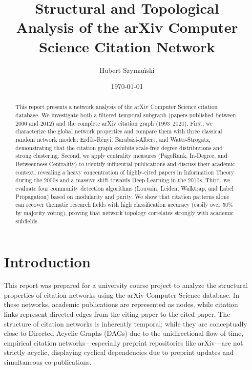 \documentclass[11pt,a4paper]{article}
\begin{document}
\title{\textbf{\Large Structural and Topological Analysis of the arXiv Computer Science Citation Network}}
\author{Hubert Szymański}
\date{\today}
\maketitle

\begin{abstract}
This report presents a network analysis of the arXiv Computer Science citation database. We investigate
both a filtered temporal subgraph (papers published between 2000 and 2012) and the complete arXiv citation
graph (1993--2020). First, we characterize the global network properties and compare them with three
classical random network models: Erd\H{o}s-R\'{e}nyi, Barab\'{a}si-Albert, and Watts-Strogatz,
demonstrating that the citation graph exhibits scale-free degree distributions and strong clustering.
Second, we apply centrality measures (PageRank, In-Degree, and Betweenness Centrality) to identify
influential publications and discuss their academic context, revealing a heavy concentration of
highly-cited papers in Information Theory during the 2000s and a massive shift towards Deep Learning in
the 2010s. Third, we evaluate four community detection algorithms (Louvain, Leiden, Walktrap, and Label
Propagation) based on modularity and purity. We show that citation patterns alone can recover thematic
research fields with high classification accuracy (easily over 50\% by majority voting), proving that network
topology correlates strongly with academic subfields.
\end{abstract}

\section{Introduction}
This report was prepared for a university course project to analyze the structural properties of citation networks using the arXiv Computer Science database. In these networks, academic publications are represented as nodes, while citation links represent directed edges from the citing paper to the cited paper. The structure of citation networks is inherently temporal; while they are conceptually close to Directed Acyclic Graphs (DAGs) due to the unidirectional flow of time, empirical citation networks—especially preprint repositories like arXiv—are not strictly acyclic, displaying cyclical dependencies due to preprint updates and simultaneous co-publications.
\end{document}
